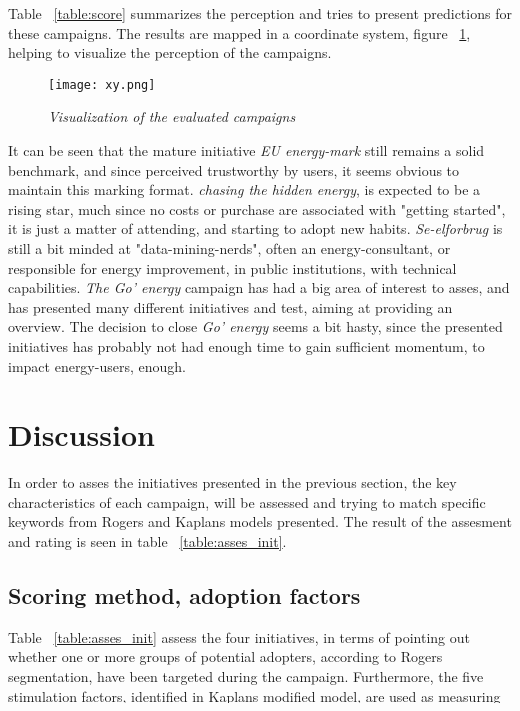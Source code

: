 \documentclass[journal]{IEEEtran}
\begin{document}
Table ~\ref{table:score} summarizes the perception and tries to present predictions for these campaigns. The results are mapped in a coordinate system, figure  ~\ref{fig:xy},  helping to visualize the perception of the campaigns.

\begin{figure}
\texttt{[image: xy.png]}
\caption{\textit{Visualization of the evaluated campaigns}}			
\label{fig:xy} %
\end{figure}


It can be seen that the mature initiative \textit{EU energy-mark} still remains a solid benchmark, and since perceived trustworthy by users, it seems obvious to maintain this marking format.
\textit{chasing the hidden energy}, is expected to be a rising star, much since no costs or purchase are associated with "getting started", it is just a matter of attending, and starting to adopt new habits.
\textit{Se-elforbrug} is still a bit minded at "data-mining-nerds", often an energy-consultant, or responsible for energy improvement, in public institutions, with technical capabilities.
\textit{The Go' energy} campaign has had a big area of interest to asses, and has presented many different initiatives and test, aiming at providing an overview. The decision to close \textit{Go' energy} seems a bit hasty, since the presented initiatives has probably not had enough time to gain sufficient momentum, to impact energy-users, enough.     



\section{Discussion}
In order to asses the initiatives presented in the previous section, the key characteristics of each campaign, will be assessed and trying to match specific keywords from Rogers and Kaplans models presented.
The result of the assesment and rating is seen in table ~\ref{table:asses_init}.

\subsection{Scoring method, adoption factors}
Table ~\ref{table:asses_init} assess the four initiatives, in terms of pointing out whether one or more groups of potential adopters, according to Rogers segmentation, have been targeted during the campaign. 
Furthermore, the five stimulation factors, identified in Kaplans modified model, are used as measuring points, thus aiming at identifying whether the campaigns message has a potential for stimulating adoption. 
\end{document}
